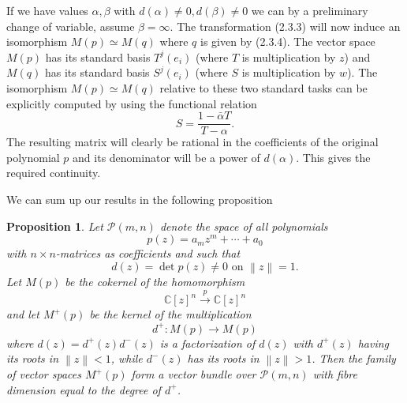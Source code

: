 \documentclass[leqno]{book}
\numberwithin{equation}{section}
\newtheorem{proposition}[theorem]{Proposition}
\theoremstyle{definition}
\begin{document}
            If we have values $\alpha,\beta$ with $d(\alpha)\neq 0, d(\beta)\neq 0$ we can by a preliminary change of variable, assume $\beta=\infty$. The transformation (2.3.3) will now induce an isomorphism $M(p)\simeq M(q)$ where $q$ is given by (2.3.4). The vector space $M(p)$ has its standard basis $T^{j}(e_{i})$ (where $T$ is multiplication by $z$) and $M(q)$ has its standard basis $S^{j}(e_{i})$ (where $S$ is multiplication by $w$). The isomorphism $M(p)\simeq M(q)$ relative to these two standard tasks can be explicitly computed by using the functional relation
            \begin{equation*}
              S=\frac{1-\bar{\alpha}T}{T-\alpha}.
            \end{equation*}
            The resulting matrix will clearly be rational in the coefficients of the original polynomial $p$ and its denominator will be a power of $d(\alpha)$. This gives the required continuity.

            We can sum up our results in the following proposition
            \setcounter{theorem}{4}
            \begin{proposition}
              Let $\mathcal{P}(m,n)$ denote the space of all polynomials
              \begin{equation*}
                p(z)=a_{m}z^{m}+ \cdots +a_0
              \end{equation*}
              with $n\times n$-matrices as coefficients and such that 
              \begin{equation*}
                d(z)=\det p(z)\neq 0 \text{ on } \left\| z \right\|=1.
              \end{equation*}
              Let $M(p)$ be the cokernel of the homomorphism 
              \begin{equation*}
                \mathbb{C}[z]^{n}\stackrel{p}{\rightarrow} \mathbb{C}[z]^{n}
              \end{equation*}
              and let $M^{+}(p)$ be the kernel of the multiplication
              \begin{equation*}
                d^{+}:M(p)\to M(p)
              \end{equation*}
              where $d(z)=d^{+}(z)d^{-}(z)$ is a factorization of $d(z)$ with $d^{+}(z)$ having its roots in $\left\| z \right\|<1$, while $d^{-}(z)$ has its roots in $\left\| z \right\|>1$. Then the family of vector spaces $M^{+}(p)$ form a vector bundle over $\mathcal{P}(m,n)$ with fibre dimension equal to the degree of $d^{+}$.

            \end{proposition}
\end{document}

